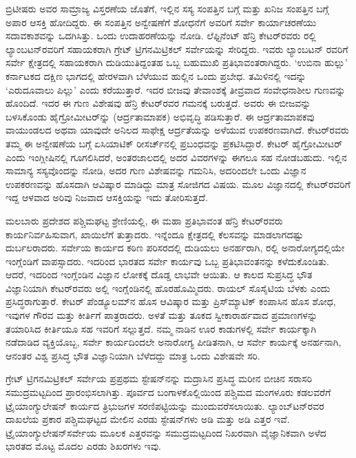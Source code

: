 ಬ್ರಿಟೀಷರು ಅವರ ಸಾಮ್ರಾಜ್ಯ ವಿಸ್ತರಣೆಯ ಜೊತೆಗೆ, ಇಲ್ಲಿನ ಸಸ್ಯ ಸಂಪತ್ತಿನ ಬಗ್ಗೆ ಮತ್ತು ಖನಿಜ ಸಂಪತ್ತಿನ ಬಗ್ಗೆ ಅಪಾರ ಆಸಕ್ತಿ ಹೋದಿದ್ದರು. ಈ ಸಂಪತ್ತಿನ ಅನ್ವೇಷಣೆಗೆ ಶೋಧನೆಗೆ ಅವರಿಗೆ ಸರ್ವೇ ಕಾರ್ಯಾಚರಣೆಯು ಸದಾವಕಾಶವನ್ನು ಒದಗಿಸಿತ್ತು. ಒಂದು ಉದಾಹರಣೆಯನ್ನು ನೋಡಿ. ಲೆಫ್ಟಿನೆಂಟ್​ ಹೆನ್ರಿ ಕೇಟರ್​ರವರು  ರಲ್ಲಿ ಲ್ಯಾಂಬಟನ್​ರವರಿಗೆ ಸಹಾಯಕರಾಗಿ ಗ್ರೇಟ್​ ಟ್ರಿಗನಮಿಟ್ರಿಕಲ್​ ಸರ್ವೇಯನ್ನು ಸೇರಿದ್ದರು. ಇವರು ಲ್ಯಾಂಬಟನ್​ ರವರಿಗೆ ಸರ್ವೇ ಕ್ಷೇತ್ರದಲ್ಲಿ ಸಹಾಯಕರಾಗಿ ದುಡಿಯುತಿದ್ದಂತಹ ಒಬ್ಬ ಬಹುಮುಖಿ ಪ್ರತಿಭಾವಂತರಾಗಿದ್ದರು. ‘ಉಬಿನಾ ಹುಲ್ಲು’ ಕರ್ನಾಟಕದ ದಕ್ಷಿಣ ಭಾಗದಲ್ಲಿ ಹೇರಳವಾಗಿ ಬೆಳೆಯುವ ಹುಲ್ಲಿನ ಒಂದು ಪ್ರಬೇಧ. ತಮಿಳಿನಲ್ಲಿ ಇದನ್ನು ‘ಎರುದೂವಾಲು ಪಿಲ್ಲು’ ಎಂದು ಕರೆಯುತ್ತಾರೆ. ಇದರ ಬೀಜವು ತೇವಾಂಶಕ್ಕೆ ತೀವ್ರವಾದ ಸಂವೇಧನಾಶೀಲ ಗುಣವನ್ನು ಹೊಂದಿದೆ. ಇದರ ಈ ಗುಣ ವಿಶೇಷವು ಹೆನ್ರಿ ಕೇಟರ್​ರವರ ಗಮನಕ್ಕೆ ಬರುತ್ತದೆ. ಅವರು ಈ ಬೀಜವನ್ನು ಬಳಸಿಕೊಂಡು ಹೈಗ್ರೋಮೀಟರ್​ನ್ನು (ಆರ್ದ್ರತಾಮಾಪಕ) ಅಭಿವೃದ್ಧಿ ಪಡಿಸುತ್ತಾರೆ. ಈ ಆರ್ದ್ರತಾಮಾಪಕವು ವಾಯುಂಡಲದ ಅಥವಾ ಯಾವುದೇ ಅನಿಲದ ಸಾಫೇಕ್ಷ ಆರ್ದ್ರತೆಯನ್ನು ಅಳೆಯುವ ಉಪಕರಣವಾಗಿದೆ. ಕೇಟರ್​ರವರು ತಮ್ಮ ಈ ಅನ್ವೇಷಣೆಯ ಬಗ್ಗೆ ಏಸಿಯಾಟಿಕ್​ ರೀಸರ್ಚ್‌ನಲ್ಲಿ ಪ್ರಬಂಧವನ್ನು ಪ್ರಕಟಿಸಿದ್ದಾರೆ. ಕೇಟರ್​ ಹೈಗ್ರೋಮೀಟರ್​ ಎಂದು ಇಂಗ್ಲೀಷಿನಲ್ಲಿ ಗೂಗಲಿಸಿದರೆ, ಅಂತರಜಾಲದಲ್ಲಿ ಅದರ ವಿವರಗಳನ್ನು ಈಗಲೂ ಸಹ ನೋಡಬಹುದು. ಇಲ್ಲಿನ ಸಾಮಾನ್ಯ ಸಸ್ಯವೊಂದನ್ನು ನೋಡಿ, ಅದರ ಗುಣ ವಿಶೇಷವನ್ನು ಗಮನಿಸಿ, ಅದರಿಂದಲೇ ಒಂದು ವಿಜ್ಞಾನ ಉಪಕರಣವನ್ನು ಹೊಸದಾಗಿ ಆವಿಷ್ಕಾರ ಮಾಡಿದ್ದು ಮಾತ್ರ ಸೋಜಿಗದ ವಿಷಯ. ಮೂಲ ವಿಜ್ಞಾನದಲ್ಲಿ ಕೇಟರ್​ರವರಿಗೆ ಇದ್ದ ಆಳವಾದ ಅರಿವು ನಿಜವಾದ ಆಸಕ್ತಿಯನ್ನು ಇದು ತೋರಿಸುತ್ತದೆ.

ಮಲಬಾರು ಪ್ರದೇಶದ ಪಶ್ಚಿಮಘಟ್ಟ ಶ್ರೇಣಿಯಲ್ಲಿ, ಈ ಮಹಾ ಪ್ರತಿಭಾವಂತ ಹೆನ್ರಿ ಕೇಟರ್​ರವರು ಕಾರ್ಯನಿರ್ವಹಿಸುವಾಗ, ಖಾಯಿಲೆಗೆ ತುತ್ತಾದರು. ಇನ್ನೆಂದೂ ಕ್ಷೇತ್ರದಲ್ಲಿ ಕೆಲಸವನ್ನು ಮಾಡಲಾಗದಷ್ಟು ದುರ್ಬಲರಾದರು. ಸರ್ವೇಯ ಕಾರ್ಯದ ಕಠಿಣ ಪರಿಸರದಲ್ಲಿ ದುಡಿಯಲು ಅನರ್ಹರಾಗಿ,  ರಲ್ಲಿ ಅನಾರೋಗ್ಯದಲ್ಲಿಯೇ ಇಂಗ್ಲೆಂಡಿಗೆ ವಾಪಸ್ಸಾದರು. ಇದರಿಂದ ಭಾರತದ ಸರ್ವೇ ಕಾರ್ಯವು ಒಬ್ಬ ಪ್ರತಿಭಾವಂತನನ್ನು ಕಳೆದುಕೊಂಡಿತು. ಆದರೆ, ಇದರಿಂದ ಇಂಗ್ಲೆಂಡಿನ ವಿಜ್ಞಾನ ಲೋಕಕ್ಕೆ ದೊಡ್ಡ ಲಾಭವೇ ಆಯಿತು. ಆ ಕಾಲದ ಸುಪ್ರಸಿದ್ಧ ಭೌತ ವಿಜ್ಞಾನಿಯಾಗಿ ಕೇಟರ್​ರವರು ಅಲ್ಲಿ ಇಂಗ್ಲೆಂಡಿನಲ್ಲಿ ಹೊರಹೊಮ್ಮಿದರು. ರಾಯಲ್​ ಸೊಸೈಟಿಯ ಬೆಳಕು ಎಂದು ಪ್ರಸಿದ್ಧರಾಗುತ್ತಾರೆ. ಕೇಟರ್​ ಪೆಂಡ್ಯೂಲಮ್‌ನ ಹೊಸ ಆವಿಷ್ಕಾರ ಮತ್ತು ಪ್ರಿಸ್​ಮ್ಯಾಟಿಕ್​ ಕಂಪಾಸಿನ ಹೊಸ ಶೋಧ, ಇವುಗಳ ಗೌರವ ಮತ್ತು ಕೀರ್ತಿಗೆ ಪಾತ್ರರಾದರು. ಅಳತೆ ಮತ್ತು ತೂಕದ ಸ್ವೀಕಾರಾರ್ಹವಾದ ಪ್ರಮಾಣಗಳನ್ನು ತಯಾರಿಸಿದ ಕೀರ್ತಿಯೂ ಸಹ ಇವರಿಗೆ ಸಲ್ಲುತ್ತದೆ. ನಮ್ಮ ನಾಡಿನ ಊರ ಕಾಡುಗಳಲ್ಲಿ ಸರ್ವೇ ಕಾರ್ಯಕ್ಕಾಗಿ ನಡೆದಾಡಿದ ವ್ಯಕ್ತಿಯೊಬ್ಬ, ಸರ್ವೇ ಕಾರ್ಯದಿಂದಲೇ ಅನಾರೋಗ್ಯ ಪೀಡಿತನಾಗಿ, ಆ ಸರ್ವೇ ಕಾರ್ಯಕ್ಕೆ ಅನರ್ಹನಾಗಿ, ಆನಂತರ ವಿಶ್ವ ಪ್ರಸಿದ್ಧ ಭೌತ ವಿಜ್ಞಾನಿಯಾಗಿ ಬೆಳೆದದ್ದು ಮಾತ್ರ ಒಂದು ವಿಶೇಷವೇ ಸರಿ.

ಗ್ರೇಟ್​ ಟ್ರಿಗನಮಿಟ್ರಿಕಲ್​ ಸರ್ವೇಯ ಪ್ರಪ್ರಥಮ ಸ್ಟೇಷನ್​ನನ್ನು ಮದ್ರಾಸಿನ ಪ್ರಸಿದ್ಧ ಮರೀನ ಬೀಚಿನ ಸರಾಸರಿ ಸಮುದ್ರಮಟ್ಟದಿಂದ ಪ್ರಾರಂಭಿಸಲಾಗಿತ್ತು. ಪೂರ್ವದ ಬಂಗಾಳಕೊಲ್ಲಿಯಿಂದ ಪಶ್ಚಿಮದ ಮಂಗಳೂರು ಕಡಲವರೆಗೆ ಟ್ರೈಯಾಂಗ್ಯುಲೇಷನ್​ ಕಾರ್ಯದ ತ್ರಿಭುಜಗಳ ಸರಣಿಪಟ್ಟಿಯನ್ನು ಮುಂದುವರೆಸಲಾಯಿತು. ಲ್ಯಾಂಬ್​ಟನ್​ರವರ ದಾಖಲೆಯ ಪ್ರಕಾರ ಪಶ್ಚಿಮಘಟ್ಟದ ಮೇಲಿನ ಎರಡು ಸ್ಟೇಷನ್​ಗಳು  ಅಡಿ ಮತ್ತು  ಅಡಿ ಎತ್ತರ ಇವೆ. ಟ್ರೈಯಾಂಗ್ಯುಲೇಷನ್​ ಸರ್ವೇಯ ಮೂಲಕ ಎತ್ತರವನ್ನು ಸಮುದ್ರಮಟ್ಟದಿಂದ ನಿಖರವಾಗಿ ವೈಜ್ಞಾನಿಕವಾಗಿ ಅಳೆದ ಭಾರತದ ಮೊಟ್ಟ ಮೊದಲ ಎರಡು ಶಿಖರಗಳು ಇವು.

